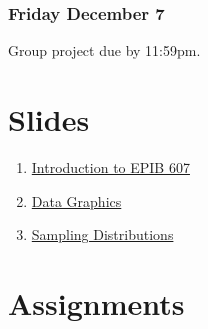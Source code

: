 \documentclass[]{book}
\providecommand{\tightlist}{%
  \setlength{\itemsep}{0pt}\setlength{\parskip}{0pt}}
\let\originaltabular\tabular
\let\endoriginaltabular\endtabular
\renewenvironment{tabular}[1]{%
  \begingroup%
  \centering%
  \originaltabular{#1}}%
  {\endoriginaltabular\endgroup}
\providecommand{\tightlist}{%
  \setlength{\itemsep}{0pt}\setlength{\parskip}{0pt}}
\theoremstyle{definition}
\theoremstyle{definition}
\theoremstyle{definition}
\theoremstyle{remark}
\begin{document}
\subsection{Friday December 7}\label{friday-december-7}

\begin{table}[H]
\centering
\begin{tabular}{l}
\hline
Group project due by 11:59pm.\\
\hline
\end{tabular}
\end{table}

\chapter{Slides}\label{slides}

\begin{enumerate}
\def\labelenumi{\arabic{enumi}.}
\tightlist
\item
  \href{https://docs.google.com/presentation/d/15c0YIS2KJXFzTKgFfQ_xDjTAcvPyQb8JhSLGvsEHJ6o/edit?usp=sharing}{Introduction
  to EPIB 607}
\item
  \href{https://docs.google.com/presentation/d/1wXgcTzcRKl_leGRfNZjWWPkjwJSTlZSXBCl-fFuLEaE/edit?usp=sharing}{Data
  Graphics}
\item
  \href{https://github.com/sahirbhatnagar/EPIB607/raw/master/slides/sampling_dist/EPIB607_sampling_dist.pdf}{Sampling
  Distributions}
\end{enumerate}

\chapter{Assignments}\label{assignments}
\end{document}
